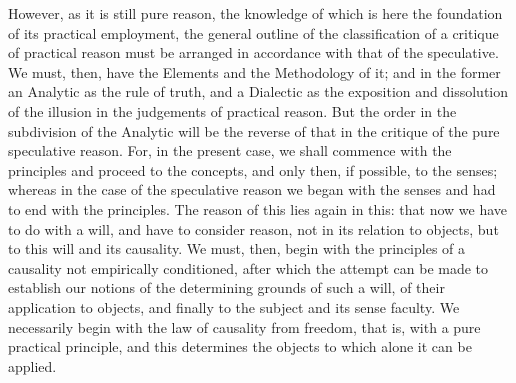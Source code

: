\documentclass[12pt]{article}
\begin{document}
  However, as it is still pure reason, the knowledge of which is
here the foundation of its practical employment, the general outline
of the classification of a critique of practical reason must be
arranged in accordance with that of the speculative. We must, then,
have the Elements and the Methodology of it; and in the former an
Analytic as the rule of truth, and a Dialectic as the exposition and
dissolution of the illusion in the judgements of practical reason. But
the order in the subdivision of the Analytic will be the reverse of
that in the critique of the pure speculative reason. For, in the
present case, we shall commence with the principles and proceed to the
concepts, and only then, if possible, to the senses; whereas in the
case of the speculative reason we began with the senses and had to end
with the principles. The reason of this lies again in this: that now
we have to do with a will, and have to consider reason, not in its
relation to objects, but to this will and its causality. We must,
then, begin with the principles of a causality not empirically
conditioned, after which the attempt can be made to establish our
notions of the determining grounds of such a will, of their
application to objects, and finally to the subject and its sense
faculty. We necessarily begin with the law of causality from
freedom, that is, with a pure practical principle, and this determines
the objects to which alone it can be applied.
\end{document}
